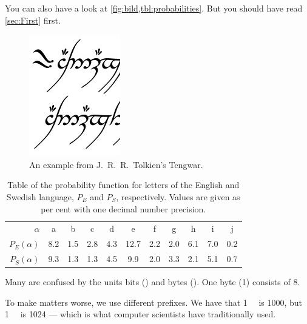 \documentclass[a4paper]{article}
\begin{document}
You can also have a look at \cref{fig:bild,tbl:probabilities}.
But you should have read \cref{sec:First} first.

\begin{figure}
  \centering
  \includegraphics[width=0.2\linewidth]{tengwar.jpg}
  \caption{An example from J.~R.~R.~Tolkien's Tengwar.}
  \label{fig:bild}
\end{figure}

\begin{table}
  \centering
  \begin{tabular}{rcccccccccc}
    \toprule
    \(\alpha\) & a & b & c & d & e & f & g & h & i & j \\
    \(P_E(\alpha)\) & 8.2  & 1.5 & 2.8 & 4.3 & 12.7 & 2.2 & 2.0 & 6.1 & 7.0 & 0.2 \\
    \(P_S(\alpha)\) & 9.3  & 1.3 & 1.3 & 4.5 & 9.9 & 2.0 & 3.3 & 2.1 & 5.1 & 0.7 \\
    \bottomrule
  \end{tabular}
  \caption{Table of the probability function for letters of the English and 
  Swedish language, \(P_E\) and \(P_S\), respectively.
  Values are given as per cent with one decimal number precision.}
  \label{tbl:probabilities}
\end{table}

Many are confused by the units bits (\si{\bit}) and bytes (\si{\byte}).
One byte (\SI{1}{\byte}) consists of \SI{8}{\bit}.

To make matters worse, we use different prefixes.
We have that \SI{1}{\kilo\byte} is \SI{1000}{\byte}, but \SI{1}{\kibi\byte} is 
\SI{1024}{\byte} --- which is what computer scientists have traditionally used.


\printbibliography
\end{document}
